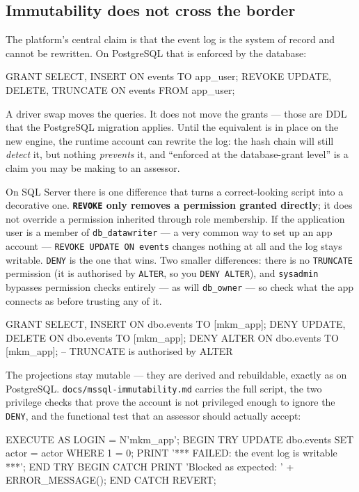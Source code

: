 \documentclass[11pt]{article}
\begin{document}
\subsection{Immutability does not cross the border}

The platform's central claim is that the event log is the system of record and cannot be
rewritten. On PostgreSQL that is enforced by the database:

\begin{code}
GRANT SELECT, INSERT ON events TO {{app_user}};
REVOKE UPDATE, DELETE, TRUNCATE ON events FROM {{app_user}};
\end{code}

A driver swap moves the queries. It does not move the grants --- those are DDL that the
PostgreSQL migration applies. Until the equivalent is in place on the new engine, the
runtime account can rewrite the log: the hash chain will still \emph{detect} it, but nothing
\emph{prevents} it, and ``enforced at the database-grant level'' is a claim you may be
making to an assessor.

On SQL Server there is one difference that turns a correct-looking script into a decorative
one. \textbf{\texttt{REVOKE} only removes a permission granted directly}; it does not
override a permission inherited through role membership. If the application user is a member
of \texttt{db\_datawriter} --- a very common way to set up an app account ---
\texttt{REVOKE UPDATE ON events} changes nothing at all and the log stays writable.
\texttt{DENY} is the one that wins. Two smaller differences: there is no \texttt{TRUNCATE}
permission (it is authorised by \texttt{ALTER}, so you \texttt{DENY ALTER}), and
\texttt{sysadmin} bypasses permission checks entirely --- as will \texttt{db\_owner} ---
so check what the app connects as before trusting any of it.

\begin{code}
GRANT SELECT, INSERT ON dbo.events TO [mkm_app];
DENY UPDATE, DELETE ON dbo.events TO [mkm_app];
DENY ALTER ON dbo.events TO [mkm_app];      -- TRUNCATE is authorised by ALTER
\end{code}

The projections stay mutable --- they are derived and rebuildable, exactly as on
PostgreSQL. \texttt{docs/mssql-immutability.md} carries the full script, the two privilege
checks that prove the account is not privileged enough to ignore the \texttt{DENY}, and the
functional test that an assessor should actually accept:

\begin{code}
EXECUTE AS LOGIN = N'mkm_app';
BEGIN TRY
    UPDATE dbo.events SET actor = actor WHERE 1 = 0;
    PRINT '*** FAILED: the event log is writable ***';
END TRY
BEGIN CATCH
    PRINT 'Blocked as expected: ' + ERROR_MESSAGE();
END CATCH
REVERT;
\end{code}
\end{document}
